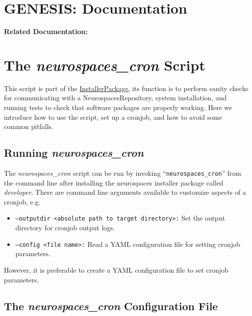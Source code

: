 \documentclass[12pt]{article}
\begin{document}
\section*{GENESIS: Documentation}

{\bf Related Documentation:}

\section*{The {\it neurospaces\_cron} Script}

This script is part of the \href{../installer-package}{InstallerPackage}, its function is to perform sanity checks for communicating with a NeurospacesRepository, system installation, and running tests to check that software packages are properly working. Here we introduce how to use the script, set up a cronjob, and how to avoid some common pitfalls.

\subsection*{Running {\it neurospaces\_cron}}

The {\it neurospaces\_cron} script can be run by invoking ``{\tt neurospaces\_cron}'' from the command line after installing the neurospaces installer package called {\it developer}. There are command line arguments available to customize aspects of a cronjob, e.g.
\begin{itemize}
   \item {\tt --outputdir <absolute path to target directory>:} Set the output directory for cronjob output logs.
   \item {\tt --config <file name>:} Read a YAML configuration file for setting cronjob parameters.
\end{itemize}
However, it is preferable to create a YAML configuration file to set cronjob parameters.

\subsection*{The  {\it neurospaces\_cron} Configuration File}
\end{document}

